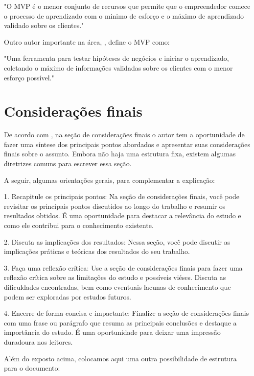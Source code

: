 \documentclass[
	article,			%
	12pt,				%
	oneside,			%
	a4paper,			%
    BIBLATEX,           %
	english,			%
	brazil,				%
	sumario=tradicional
	]{abntex2}
\begin{document}
"O MVP é o menor conjunto de recursos que permite que o empreendedor comece o processo de aprendizado com o mínimo de esforço e o máximo de aprendizado validado sobre os clientes."

Outro autor importante na área, , define o MVP como:

"Uma ferramenta para testar hipóteses de negócios e iniciar o aprendizado, coletando o máximo de informações validadas sobre os clientes com o menor esforço possível."


% 

\section{Considerações finais}


De acordo com , na seção de considerações finais o autor tem a oportunidade de fazer uma síntese dos principais pontos abordados e apresentar suas considerações finais sobre o assunto. Embora não haja uma estrutura fixa, existem algumas diretrizes comuns para escrever essa seção.

A seguir, algumas orientações gerais, para complementar a explicação:

1. Recapitule os principais pontos: Na seção de considerações finais, você pode revisitar os principais pontos discutidos ao longo do trabalho e resumir os resultados obtidos. É uma oportunidade para destacar a relevância do estudo e como ele contribui para o conhecimento existente.

2. Discuta as implicações dos resultados: Nessa seção, você pode discutir as implicações práticas e teóricas dos resultados do seu trabalho. 

3. Faça uma reflexão crítica: Use a seção de considerações finais para fazer uma reflexão crítica sobre as limitações do estudo e possíveis viéses. Discuta as dificuldades encontradas, bem como eventuais lacunas de conhecimento que podem ser exploradas por estudos futuros.

4. Encerre de forma concisa e impactante: Finalize a seção de considerações finais com uma frase ou parágrafo que resuma as principais conclusões e destaque a importância do estudo. É uma oportunidade para deixar uma impressão duradoura nos leitores.

Além do exposto acima, colocamos aqui uma outra possibilidade de estrutura para o documento:
\end{document}
